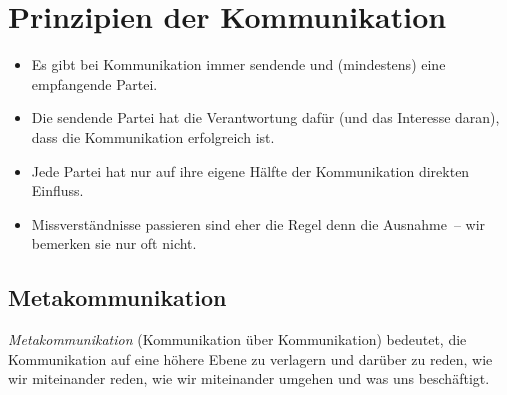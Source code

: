 \section{Prinzipien der Kommunikation}
\label{kommunikationsprinzipien}

\begin{itemize}
  \item Es gibt bei Kommunikation immer sendende und (mindestens) eine empfangende Partei.
  \item Die sendende Partei hat die Verantwortung dafür (und das Interesse daran), dass die Kommunikation erfolgreich ist.
  \item Jede Partei hat nur auf ihre eigene Hälfte der Kommunikation direkten Einfluss.
  \item Missverständnisse passieren sind eher die Regel denn die Ausnahme~-- wir bemerken sie nur oft nicht.
\end{itemize}


\subsection{Metakommunikation}
\label{metakommunikation}

\emph{Metakommunikation} (\glqq Kommunikation über Kommunikation\grqq) bedeutet, die Kommunikation auf eine höhere Ebene zu verlagern und darüber zu reden, wie wir miteinander reden, wie wir miteinander umgehen und was uns beschäftigt.
